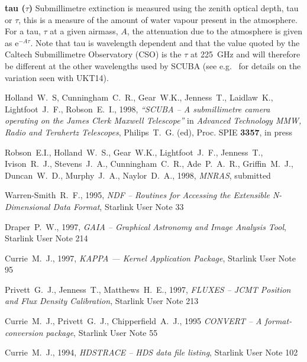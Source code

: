 \documentclass[twoside,11pt]{article}
\newcommand{\htmladdnormallink}[2]{#1}
\newcommand{\xref}[3]{#1}
\renewcommand{\_}{\texttt{\symbol{95}}}
\begin{document}
\begin{description}
\item{{\bf tau ($\tau$)}} Submillimetre extinction is measured using the
zenith optical depth, tau or $\tau$, this is a measure of the amount of water
vapour present in the atmosphere. For a tau, $\tau$ at a given airmass, $A$,
the attenuation due to the atmosphere is given as e$^{-A \tau}$. Note that tau
is wavelength dependent and that the value quoted by the 
\htmladdnormallink{Caltech Submillimetre Observatory}{http://www.cco.caltech.edu/\~{}cso/} (CSO) is the $\tau$ at 225~GHz and will therefore be different at
the other wavelengths used by SCUBA (see e.g.\ \cite{SR94} for details on the
variation seen with UKT14).

\end{description}

\clearpage
\begin{thebibliography}{}

Holland~W.~S, Cunningham~C.~R., Gear~W.K., Jenness~T., Laidlaw~K.,
Lightfoot~J.~F., Robson~E.~I., 1998, \textit{``SCUBA -- A submillimetre camera
operating on the James Clerk Maxwell Telescope''} in \textit{Advanced
Technology MMW, Radio and Terahertz Telescopes}, Philips~T.~G. (ed),
Proc. SPIE \textbf{3357}, in press

Robson~E.I., Holland~W.~S., Gear~W.K., Lightfoot~J.~F., Jenness~T.,
Ivison~R.~J., Stevens~J.~A., Cunningham~C.~R., Ade~P.~A.~R.,
Griffin~M.~J., Duncan~W.~D., Murphy~J.~A., Naylor~D.~A., 1998,
\textit{MNRAS}, submitted

Warren-Smith~R.~F., 1995, {\it NDF -- Routines for Accessing the Extensible
N-Dimensional Data Format}, \xref{Starlink User Note 33}{sun33}{}

Draper~P.~W., 1997, {\it GAIA -- Graphical Astronomy and Image Analysis Tool},
\xref{Starlink User Note 214}{sun214}{}

Currie~M.~J., 1997, {\it KAPPA --- Kernel Application Package},
\xref{Starlink User Note 95}{sun95}{}

Privett~G.~J., Jenness~T., Matthews~H.~E., 1997, {\it FLUXES --
JCMT Position and Flux Density Calibration}, 
\xref{Starlink User Note 213}{sun213}{}

Currie~M.~J., Privett~G.~J., Chipperfield~A.~J., 1995 {\it CONVERT --
A format-conversion package}, \xref{Starlink User Note 55}{sun55}{}

Currie~M.~J., 1994, {\it HDSTRACE -- HDS data file listing}, 
\xref{Starlink User Note 102}{sun102}{}


\end{thebibliography}
\end{document}

